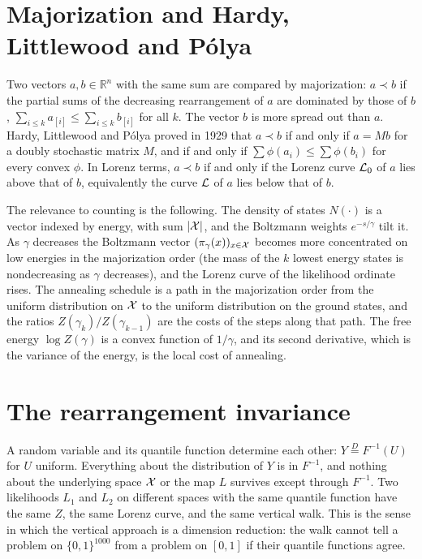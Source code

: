 \section{Majorization and Hardy, Littlewood and P\'olya}

Two vectors $a, b \in \mathbb{R}^n$ with the same sum are compared by majorization: $a \prec b$ if the partial sums of the decreasing rearrangement of $a$ are dominated by those of $b$, $\sum_{i \le k} a_{[i]} \le \sum_{i \le k} b_{[i]}$ for all $k$. The vector $b$ is more spread out than $a$. Hardy, Littlewood and P\'olya proved in 1929 that $a \prec b$ if and only if $a = Mb$ for a doubly stochastic matrix $M$, and if and only if $\sum \phi(a_i) \le \sum \phi(b_i)$ for every convex $\phi$. In Lorenz terms, $a \prec b$ if and only if the Lorenz curve $\mathcal{L}_0$ of $a$ lies above that of $b$, equivalently the curve $\mathcal{L}$ of $a$ lies below that of $b$.

The relevance to counting is the following. The density of states $N(\cdot)$ is a vector indexed by energy, with sum $|\mathcal{X}|$, and the Boltzmann weights $e^{-s/\gamma}$ tilt it. As $\gamma$ decreases the Boltzmann vector $(\pi_\gamma(x))_{x \in \mathcal{X}}$ becomes more concentrated on low energies in the majorization order (the mass of the $k$ lowest energy states is nondecreasing as $\gamma$ decreases), and the Lorenz curve of the likelihood ordinate rises. The annealing schedule is a path in the majorization order from the uniform distribution on $\mathcal{X}$ to the uniform distribution on the ground states, and the ratios $Z(\gamma_k) / Z(\gamma_{k-1})$ are the costs of the steps along that path. The free energy $\log Z(\gamma)$ is a convex function of $1/\gamma$, and its second derivative, which is the variance of the energy, is the local cost of annealing.

\section{The rearrangement invariance}

A random variable and its quantile function determine each other: $Y \overset{D}{=} F^{-1}(U)$ for $U$ uniform. Everything about the distribution of $Y$ is in $F^{-1}$, and nothing about the underlying space $\mathcal{X}$ or the map $L$ survives except through $F^{-1}$. Two likelihoods $L_1$ and $L_2$ on different spaces with the same quantile function have the same $Z$, the same Lorenz curve, and the same vertical walk. This is the sense in which the vertical approach is a dimension reduction: the walk cannot tell a problem on $\{0,1\}^{1000}$ from a problem on $[0,1]$ if their quantile functions agree.

